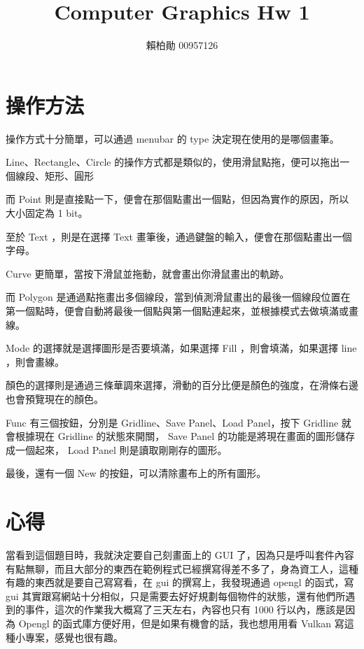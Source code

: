 \documentclass[a4,12pt]{article}
\title{Computer Graphics Hw 1}
\author{賴柏勛 00957126}
\begin{document}
    \maketitle
    \section{操作方法}
    

    操作方式十分簡單，可以通過 menubar 的 type 決定現在使用的是哪個畫筆。
    
    Line、Rectangle、Circle 的操作方式都是類似的，使用滑鼠點拖，便可以拖出一個線段、矩形、圓形

    而 Point 則是直接點一下，便會在那個點畫出一個點，但因為實作的原因，所以大小固定為 1 bit。

    至於 Text ，則是在選擇 Text 畫筆後，通過鍵盤的輸入，便會在那個點畫出一個字母。

    Curve 更簡單，當按下滑鼠並拖動，就會畫出你滑鼠畫出的軌跡。

    而 Polygon 是通過點拖畫出多個線段，當到偵測滑鼠畫出的最後一個線段位置在第一個點時，便會自動將最後一個點與第一個點連起來，並根據模式去做填滿或畫線。

    Mode 的選擇就是選擇圖形是否要填滿，如果選擇 Fill ，則會填滿，如果選擇 line ，則會畫線。

    顏色的選擇則是通過三條華調來選擇，滑動的百分比便是顏色的強度，在滑條右邊也會預覽現在的顏色。
    
    Func 有三個按鈕，分別是 Gridline、Save Panel、Load Panel，按下 Gridline 就會根據現在 Gridline 的狀態來開關， Save Panel 的功能是將現在畫面的圖形儲存成一個起來， Load Panel 則是讀取剛剛存的圖形。
    
    最後，還有一個 New 的按鈕，可以清除畫布上的所有圖形。
    \section{心得}
    當看到這個題目時，我就決定要自己刻畫面上的 GUI 了，因為只是呼叫套件內容有點無聊，而且大部分的東西在範例程式已經撰寫得差不多了，身為資工人，這種有趣的東西就是要自己寫寫看，在 gui 的撰寫上，我發現通過 opengl 的函式，寫 gui 其實跟寫網站十分相似，只是需要去好好規劃每個物件的狀態，還有他們所遇到的事件，這次的作業我大概寫了三天左右，內容也只有 1000 行以內，應該是因為 Opengl 的函式庫方便好用，但是如果有機會的話，我也想用用看 Vulkan 寫這種小專案，感覺也很有趣。
    
\end{document}
